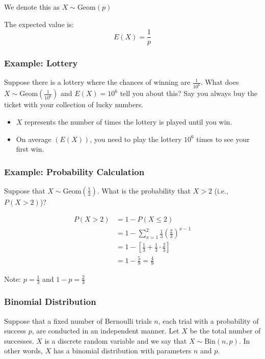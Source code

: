 \documentclass{article}
\begin{document}
    We denote this as $X \sim \text{Geom}(p)$

    The expected value is:
    \[
    E(X) = \frac{1}{p}
    \]

    \subsubsection*{Example: Lottery}
    Suppose there is a lottery where the chances of winning are $\frac{1}{10^6}$. What does $X \sim \text{Geom}(\frac{1}{10^6})$ and $E(X) = 10^6$ tell you about this? Say you always buy the ticket with your collection of lucky numbers.

    \begin{itemize}
        \item $X$ represents the number of times the lottery is played until you win.
        \item On average $(E(X))$, you need to play the lottery $10^6$ times to see your first win.
    \end{itemize}
    
    \subsubsection*{Example: Probability Calculation}
    Suppose that $X \sim \text{Geom}(\frac{1}{3})$. What is the probability that $X > 2$ (i.e., $P(X > 2)$)?
    
    \begin{align*}
    P(X > 2) &= 1 - P(X \leq 2) \\
    &= 1 - \sum_{x=1}^{2} \frac{1}{3} \left(\frac{2}{3}\right)^{x-1} \\
    &= 1 - \left[\frac{1}{3} + \frac{1}{3} \cdot \frac{2}{3}\right] \\
    &= 1 - \frac{5}{9} = \frac{4}{9}
    \end{align*}
    
    Note: $p = \frac{1}{3}$ and $1-p = \frac{2}{3}$

    \subsubsection*{Binomial Distribution}

    Suppose that a fixed number of Bernoulli trials $n$, each trial with a probability of success $p$, are conducted in an independent manner. Let $X$ be the total number of successes. $X$ is a discrete random variable and we say that $X \sim \text{Bin}(n, p)$. In other words, $X$ has a binomial distribution with parameters $n$ and $p$.
\end{document}
